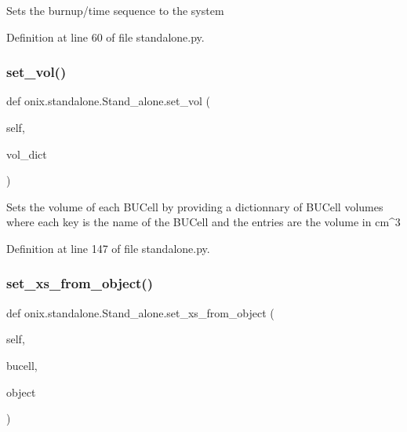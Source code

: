 \begin{DoxyVerb}Sets the burnup/time sequence to the system\end{DoxyVerb}
 

Definition at line 60 of file standalone.\+py.

\mbox{\label{classonix_1_1standalone_1_1Stand__alone_acae12979c1005ff2899536738a02f481}} 
\subsubsection{\texorpdfstring{set\+\_\+vol()}{set\_vol()}}
{\footnotesize\ttfamily def onix.\+standalone.\+Stand\+\_\+alone.\+set\+\_\+vol (\begin{DoxyParamCaption}\item[{}]{self,  }\item[{}]{vol\+\_\+dict }\end{DoxyParamCaption})}

\begin{DoxyVerb}Sets the volume of each BUCell by providing a dictionnary of BUCell volumes
where each key is the name of the BUCell and the entries are the volume in cm^3\end{DoxyVerb}
 

Definition at line 147 of file standalone.\+py.

\mbox{\label{classonix_1_1standalone_1_1Stand__alone_a5a2c988ec8ec24e24d44a0d4e3a574ac}} 
\subsubsection{\texorpdfstring{set\+\_\+xs\+\_\+from\+\_\+object()}{set\_xs\_from\_object()}}
{\footnotesize\ttfamily def onix.\+standalone.\+Stand\+\_\+alone.\+set\+\_\+xs\+\_\+from\+\_\+object (\begin{DoxyParamCaption}\item[{}]{self,  }\item[{}]{bucell,  }\item[{}]{object }\end{DoxyParamCaption})}

